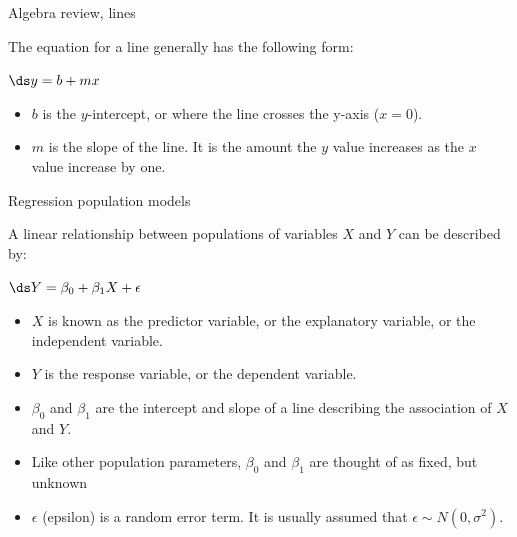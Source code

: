 \documentclass[xcolor=table]{beamer}
\begin{document}
\begin{frame}{Algebra review, lines}
\begin{block}{}
\large
The equation for a line generally has the following form:\\
\smallskip
{\centering \Large
$\ds y = b + mx$
\par}
\begin{itemize}
\item $b$ is the $y$-intercept, or where the line crosses the y-axis ($x=0$).
\item $m$ is the slope of the line. It is the amount the $y$ value increases as the $x$ value increase by one.
\end{itemize}
\end{block}
\end{frame}

\begin{frame}{Regression population models}
\begin{block}{}
\large
A linear relationship between populations of variables $X$ and $Y$ can be described by:\\
\smallskip
{\centering
$\ds Y = \beta_0 + \beta_1 X + \epsilon$
\par}
\smallskip
\begin{itemize}
\pause\item $X$ is known as the predictor variable, or the explanatory variable, or the independent variable.
\pause\item $Y$ is the response variable, or the dependent variable.
\pause\item $\beta_0$ and $\beta_1$ are the intercept and slope of a line describing the association of $X$ and $Y$.
\pause\item Like other population parameters, $\beta_0$ and $\beta_1$ are thought of as fixed, but unknown
\pause\item $\epsilon$ (epsilon) is a random error term. It is usually assumed that $\epsilon \sim N(0, \sigma^2)$.
\end{itemize}
\end{block}
\end{frame}
\end{document}
